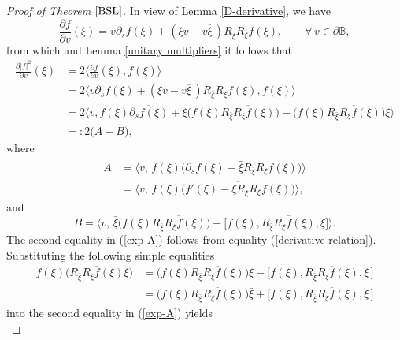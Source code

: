 \documentclass{amsart}
\theoremstyle{definition}
\theoremstyle{remark}
\numberwithin{equation}{section}
\begin{document}
\begin{proof}[Proof of Theorem $\ref{BSL}$]
In view of Lemma \ref{D-derivative}, we have
$$\frac{\partial f}{\partial v}(\xi)=v\partial_sf(\xi)+(\xi v-v\overline{\xi}\,)R_{\overline{\xi}}R_{\xi}f(\xi),\qquad \forall\,v\in\partial \mathbb B,$$
from which and Lemma \ref{unitary multipliers} it follows that
\begin{equation}\label{der-relation1}
\begin{split}
\frac{\partial |f|^2}{\partial v}(\xi)
&=2\Big\langle\frac{\partial f}{\partial v}(\xi),f(\xi)\Big\rangle\\
&=2\Big\langle v\partial_sf(\xi)+(\xi v-v\overline{\xi}\,)R_{\bar{\xi}}R_{\xi}f(\xi),f(\xi)\Big\rangle\\
&=2\Big\langle v,f(\xi)\overline{\partial_sf(\xi)}+
\bar{\xi}\Big(f(\xi)\overline{R_{\bar{\xi}}R_{\xi}f(\xi)}\Big)-
\Big(f(\xi)\overline{R_{\bar{\xi}}R_{\xi}f(\xi)}\Big)\xi\Big\rangle\\
&=:2\big(A+B\big),
\end{split}
\end{equation}
where
\begin{equation}\label{exp-A}
\begin{split}
A&=\Big\langle v,\,f(\xi)\Big(\overline{\partial_sf(\xi)
 -\bar{\xi}R_{\bar{\xi}}R_{\xi}f(\xi)}\Big)\Big\rangle \\
&=\Big\langle v,\,f(\xi)\Big(\overline{f'(\xi)-\xi R_{\bar{\xi}}R_{\xi}f(\xi)}\Big)\Big\rangle,
\end{split}
\end{equation}
and
\begin{equation}\label{exp-B}
B=\Big\langle v,\,\bar{\xi}\Big(f(\xi)\overline{R_{\bar{\xi}}R_{\xi}f(\xi)}\Big)-\big[f(\xi), \overline{R_{\bar{\xi}}R_{\xi}f(\xi)}, \xi\big]\Big\rangle.
\end{equation}
The second equality in (\ref{exp-A}) follows from  equality (\ref{derivative-relation}).
Substituting the following simple equalities
\begin{equation*}
\begin{split}
f(\xi)\Big(\overline{R_{\bar{\xi}}R_{\xi}f(\xi)}\bar{\xi}\Big)
&=\Big(f(\xi)\overline{R_{\bar{\xi}}R_{\xi}f(\xi)}\Big)
\bar{\xi}-\big[f(\xi), \overline{R_{\bar{\xi}}R_{\xi}f(\xi)},\bar{\xi}\,\big]\\
&=\Big(f(\xi)\overline{R_{\bar{\xi}}R_{\xi}f(\xi)}\Big)
\bar{\xi}+\big[f(\xi), \overline{R_{\bar{\xi}}R_{\xi}f(\xi)},\xi\,\big]
\end{split}
\end{equation*}
into  the second equality in (\ref{exp-A}) yields
\begin{equation}\label{exp-A01}

\end{equation}
\end{proof}
\end{document}
